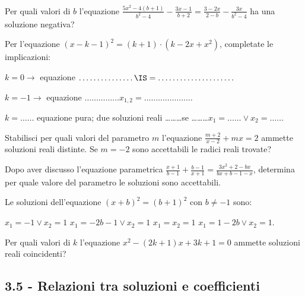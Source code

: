 \begin{esercizio}
 \label{ese:3.61}
Per quali valori di $b$ l’equazione $\frac{5 x^{2}-4 (b + 1)}{b^{2}-4}-\frac{3 x-1}{b + 2 }=\frac{3-2 x}{2-b}-\frac{3 x}{b^{2}-4}$ ha una soluzione negativa?
\end{esercizio}

\begin{esercizio}
 \label{ese:3.62}
Per l’equazione $(x-k-1)^{2}=(k + 1) \cdot (k-2 x + x^{2})$, completate le implicazioni:

$k = 0 \rightarrow$ equazione $\ldots\ldots\ldots\ldots \ldots \IS = \ldots \ldots \ldots \ldots \ldots \ldots \ldots$

$k =-1 \rightarrow$ equazione $\ldots\ldots\ldots\ldots \ldots x_{1,2} = \ldots \ldots \ldots \ldots \ldots \ldots \ldots$

$k =\ldots \ldots$ equazione pura; due soluzioni reali \ldots\ldots\ldots se \ldots\ldots \ldots $x_{1} = \ldots \ldots \vee x_{2} = \ldots \ldots$

\end{esercizio}

\begin{esercizio}
 \label{ese:3.63}
Stabilisci per quali valori del parametro $m$ l’equazione $\frac{m + 2}{x-2} + m x=2$ ammette soluzioni reali distinte. Se $m =-2$ sono accettabili le radici reali trovate?
\end{esercizio}

\begin{esercizio}
 \label{ese:3.64}
Dopo aver discusso l’equazione parametrica $\frac{x + 1}{b-1} + \frac{b-1}{x + 1}=\frac{3 x^{2} +2-b x}{b x + b-1-x}$, determina per quale valore del parametro le soluzioni sono accettabili.
\end{esercizio}

\begin{esercizio}
 \label{ese:3.65}
Le soluzioni dell’equazione $(x + b)^{2} = (b + 1)^{2}$ con $b \neq-1$ sono:

\boxA \;$x_{1} =-1\vee x _{2} = 1$
\boxB \;$x_{1} =-2 b-1 \vee x_{2} = 1$
\boxC \;$x_{1} = x_{2} = 1$
\boxD \;$x_{1} = 1-2 b \vee x_{2} = 1$.
\end{esercizio}

\begin{esercizio}
 \label{ese:3.66}
Per quali valori di $k$ l’equazione $x^{2}-(2 k + 1) x + 3 k + 1=0$ ammette soluzioni reali coincidenti?
\end{esercizio}

\subsection*{3.5 - Relazioni tra soluzioni e coefficienti}

